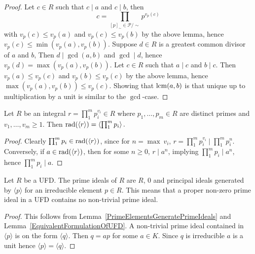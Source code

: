 \begin{proof}
    Let $c\in R$ such that $c \mid a$ and $c\mid b$, then 
    $$c=\prod_{[p]_\sim \in \mathcal{P}/\sim} p^{v_p(c)} $$
    with $v_p(c)\leq v_p(a)$ and $v_p(c)\leq v_p(b)$ by the above lemma, hence $v_p(c)\leq \min(v_p(a),v_p(b))$. Suppose $d\in R$ is a greatest common divisor of $a$ and $b$, Then $d\mid \gcd(a,b)$ and $\gcd\mid d$, hence $v_p(d)=\max(v_p(a),v_p(b))$. Let $c\in R$ such that $a \mid c$ and $b \mid c$. Then $v_p(a)\leq v_p(c)$ and $v_p(b)\leq v_p(c)$ by the above lemma, hence $\max(v_p(a),v_p(b))\leq v_p(c)$. Showing that $\mathrm{lcm}(a,b)$ is that unique up to multiplication by a unit is similar to the $\gcd$-case.
\end{proof}
\begin{lemma}\label{RadicalOfPrincipalIdealInUFD}
    Let $R$ be an integral $r = \prod_1^m p_i^{v_i} \in R$ where $p_1,\dots,p_m\in R$ are distinct primes and $v_1,\dots,v_m\geq 1$. Then $\mathrm{rad}(\langle r\rangle) = \left\langle \prod_1^m p_i \right\rangle.$
\end{lemma}
\begin{proof}
    Clearly $\prod_1^m p_i\in \mathrm{rad}(\langle r\rangle)$, since for $n = \max \ 
 v_i$, $r=\prod_1^m p_i^{v_i}\mid \prod_1^m p_i^n$. Conversely, if $a\in \mathrm{rad}(\langle r\rangle)$, then for some $n\geq 0$, $r\mid a^n$, implying $\prod_1^mp_i\mid a^n$, hence $\prod_1^m p_i\mid a$.
\end{proof}
\begin{lemma}\label{PrimeIdealsInAUFD}
    Let $R$ be a UFD. The prime ideals of $R$ are $R$, $0$ and principal ideals generated by $\langle p\rangle$ for an irreducible element $p\in R$. This means that a proper non-zero prime ideal in a UFD contains no non-trivial prime ideal. 
\end{lemma}
\begin{proof}
    This follows from Lemma~\ref{PrimeElementsGeneratePrimeIdeals} and Lemma~\ref{EquivalentFormulationOfUFD}. A non-trivial prime ideal contained in $\langle p \rangle$ is on the form $\langle q\rangle$. Then $q = ap$ for some $a\in K$. Since $q$ is irreducible $a$ is a unit hence $\langle p \rangle = \langle q\rangle$. 
\end{proof}
